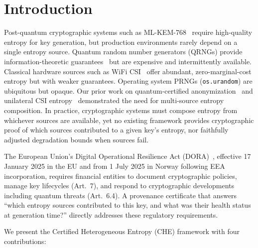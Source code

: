 \documentclass[conference,compsoc]{IEEEtran}
\newcommand{\che}{\textsc{CHE}\xspace}
\begin{document}
\section{Introduction}
\label{sec:intro}

Post-quantum cryptographic systems such as
ML-KEM-768~\cite{nist2024fips203} require high-quality entropy for
key generation, but production environments rarely depend on a single
entropy source.
%
Quantum random number generators (QRNGs) provide information-theoretic
guarantees~\cite{ma2016qrng} but are expensive and intermittently
available.
%
Classical hardware sources such as WiFi CSI~\cite{anon2026csi}
offer abundant, zero-marginal-cost entropy but with weaker guarantees.
%
Operating system PRNGs (\texttt{os.urandom}) are ubiquitous but
opaque.
%
Our prior work on quantum-certified
anonymization~\cite{anon2026quantum} and unilateral CSI
entropy~\cite{anon2026csi} demonstrated the need for
multi-source entropy composition.
%
In practice, cryptographic systems must compose entropy from
whichever sources are available, yet no existing framework provides
cryptographic proof of which sources contributed to a given key's
entropy, nor faithfully adjusted degradation bounds when sources fail.

The European Union's Digital Operational Resilience Act
(DORA)~\cite{dora2022}, effective 17 January 2025 in the EU and
from 1 July 2025 in Norway following EEA incorporation, requires
financial entities to document cryptographic policies, manage key
lifecycles (Art.~7), and respond to cryptographic developments
including quantum threats (Art.~6.4).
%
A provenance certificate that answers ``which entropy sources
contributed to this key, and what was their health status at
generation time?'' directly addresses these regulatory requirements.

We present the Certified Heterogeneous Entropy (\che) framework with
four contributions:
\end{document}

